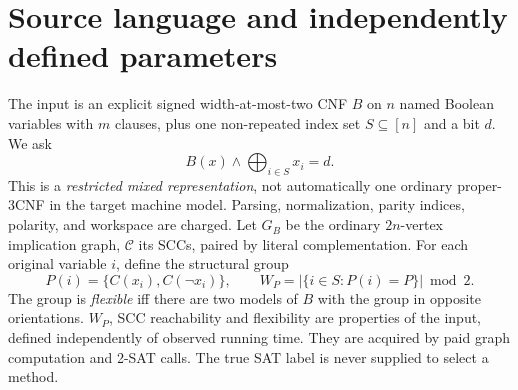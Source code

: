 \documentclass[11pt]{article}
\begin{document}
\section{Source language and independently defined parameters}
The input is an explicit signed width-at-most-two CNF $B$ on $n$ named Boolean variables with $m$ clauses, plus one non-repeated index set $S\subseteq[n]$ and a bit $d$. We ask
\[
 B(x)\land\bigoplus_{i\in S}x_i=d.
 \tag{1}
\]
This is a \emph{restricted mixed representation}, not automatically one ordinary proper-3CNF in the target machine model. Parsing, normalization, parity indices, polarity, and workspace are charged. Let $G_B$ be the ordinary $2n$-vertex implication graph, $\mathcal C$ its SCCs, paired by literal complementation. For each original variable $i$, define the structural group
\[
 P(i)=\{C(x_i),C(\neg x_i)\},\qquad
 W_P=|\{i\in S:P(i)=P\}|\bmod2.
 \tag{2}
\]
The group is \emph{flexible} iff there are two models of $B$ with the group in opposite orientations. $W_P$, SCC reachability and flexibility are properties of the input, defined independently of observed running time. They are acquired by paid graph computation and 2-SAT calls. The true SAT label is never supplied to select a method.
\end{document}
